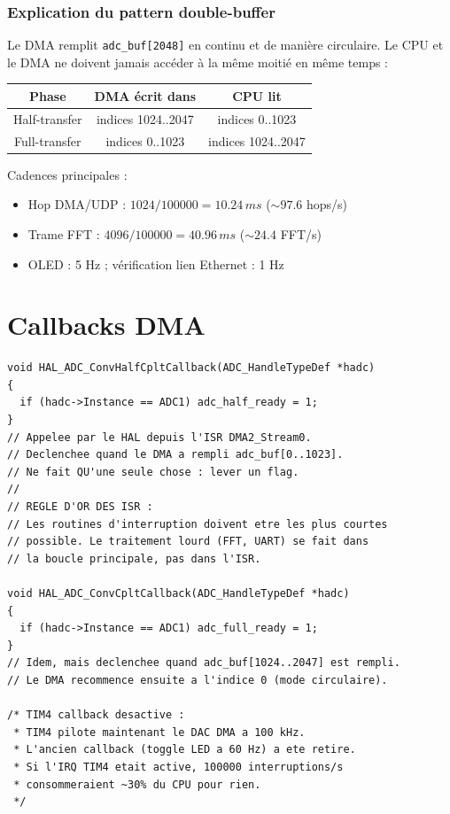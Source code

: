 \documentclass[a4paper,11pt]{article}
\newcommand{\code}[1]{\texttt{\small #1}}
\begin{document}
\subsubsection*{Explication du pattern double-buffer}

Le DMA remplit \code{adc\_buf[2048]} en continu et de mani\`ere circulaire. Le CPU et le DMA ne doivent jamais acc\'eder \`a la m\^eme moiti\'e en m\^eme temps :

\begin{center}
\small
\begin{tabular}{c c c}
\toprule
\textbf{Phase} & \textbf{DMA \'ecrit dans} & \textbf{CPU lit} \\
\midrule
Half-transfer & indices 1024..2047 & indices 0..1023 \\
Full-transfer & indices 0..1023    & indices 1024..2047 \\
\bottomrule
\end{tabular}
\end{center}

Cadences principales :
\begin{itemize}[leftmargin=2em]
  \item Hop DMA/UDP : \(1024 / 100000 = 10.24\,ms\) (\(\sim 97.6\) hops/s)
  \item Trame FFT : \(4096 / 100000 = 40.96\,ms\) (\(\sim 24.4\) FFT/s)
  \item OLED : 5 Hz ; v\'erification lien Ethernet : 1 Hz
\end{itemize}

\newpage

\section{Callbacks DMA}

\begin{lstlisting}[style=cstyle,caption={Callbacks d'interruption DMA pour l'ADC}]
void HAL_ADC_ConvHalfCpltCallback(ADC_HandleTypeDef *hadc)
{
  if (hadc->Instance == ADC1) adc_half_ready = 1;
}
// Appelee par le HAL depuis l'ISR DMA2_Stream0.
// Declenchee quand le DMA a rempli adc_buf[0..1023].
// Ne fait QU'une seule chose : lever un flag.
//
// REGLE D'OR DES ISR :
// Les routines d'interruption doivent etre les plus courtes
// possible. Le traitement lourd (FFT, UART) se fait dans
// la boucle principale, pas dans l'ISR.

void HAL_ADC_ConvCpltCallback(ADC_HandleTypeDef *hadc)
{
  if (hadc->Instance == ADC1) adc_full_ready = 1;
}
// Idem, mais declenchee quand adc_buf[1024..2047] est rempli.
// Le DMA recommence ensuite a l'indice 0 (mode circulaire).

/* TIM4 callback desactive :
 * TIM4 pilote maintenant le DAC DMA a 100 kHz.
 * L'ancien callback (toggle LED a 60 Hz) a ete retire.
 * Si l'IRQ TIM4 etait active, 100000 interruptions/s
 * consommeraient ~30% du CPU pour rien.
 */
\end{lstlisting}
\end{document}
